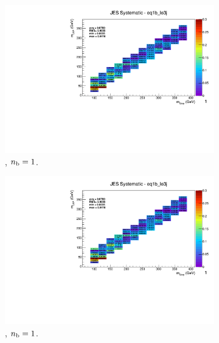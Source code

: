 \begin{figure}[ht!]
\begin{subfigure}[b]{0.32\textwidth}
    \includegraphics[width=\textwidth, page=8]{Figs/sms/t2degen/v19_2/systs/T2_4body_JES_eq1b_le3j.pdf}
    \caption{\njlow, $n_{\text{b}} = 1$.}
  \end{subfigure}
  \begin{subfigure}[b]{0.32\textwidth}
    \includegraphics[width=\textwidth, page=1]{Figs/sms/t2degen/v19_2/systs/T2_4body_JES_eq1b_le3j.pdf}
    \caption{\njlow, $n_{\text{b}} = 1$.}
    \label{fig:sms-jes-tdegen-le3j-1b}
  \end{subfigure}\\
  \begin{subfigure}[b]{0.32\textwidth}

\end{subfigure}
\end{figure}
